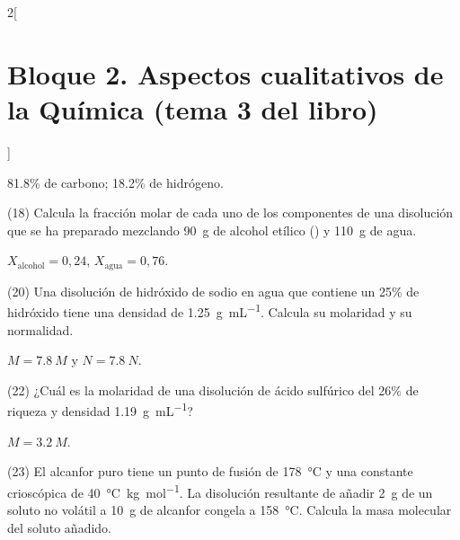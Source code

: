 \documentclass[10pt]{article}
\begin{document}
\begin{multicols}{2}[
    \section{Bloque 2. Aspectos cualitativos de la Química (tema 3 del libro)}
  ]
\begin{solution}
  \num{81,8}\% de carbono; \num{18,2}\% de hidrógeno.
\end{solution}




\begin{exercise}[
    tags    = {},
    topics  = {química,química básica},
    source  = {FQ 1B MGH 2016, p77, e18},
  ]
  (18) Calcula la fracción molar de cada uno de los componentes
  de una disolución que se ha preparado mezclando \SI{90}{\gram} de alcohol etílico () y \SI{110}{\gram} de agua.
\end{exercise}

\begin{solution}
  \( X_\textrm{alcohol} = 0,24 \),
  \( X_\textrm{agua} = 0,76 \).
\end{solution}




\begin{exercise}[
    tags    = {},
    topics  = {química,química básica},
    source  = {FQ 1B MGH 2016, p77, e20},
  ]
  (20) Una disolución de hidróxido de sodio en agua que contiene un 25\% de hidróxido tiene una densidad de \SI{1.25}{\gram\per\milli\liter}. Calcula
  su molaridad y su normalidad.
\end{exercise}

\begin{solution}
  \( M = \SI{7.8}{M} \)  y  \( N = \SI{7.8}{N} \).
\end{solution}




\begin{exercise}[
    tags    = {},
    topics  = {química,química básica},
    source  = {FQ 1B MGH 2016, p77, e22},
  ]
  (22) ¿Cuál es la molaridad de una disolución de ácido sulfúrico
  del 26\% de riqueza y densidad \SI{1.19}{\gram\per\milli\liter}?
\end{exercise}

\begin{solution}
  \( M = \SI{3.2}{M} \).
\end{solution}




\begin{exercise}[
    tags    = {},
    topics  = {química,química básica},
    source  = {FQ 1B MGH 2016, p80, e23},
  ]
  (23) El alcanfor puro tiene un punto de fusión de \SI{178}{\celsius} y una constante crioscópica de \SI{40}{\celsius\kilo\gram\per\mole}. La disolución resultante de añadir \SI{2}{\gram} de un soluto no volátil a
  \SI{10}{\gram} de alcanfor congela a \SI{158}{\celsius}. Calcula la masa molecular del soluto añadido.
\end{exercise}


\end{multicols}
\end{document}
